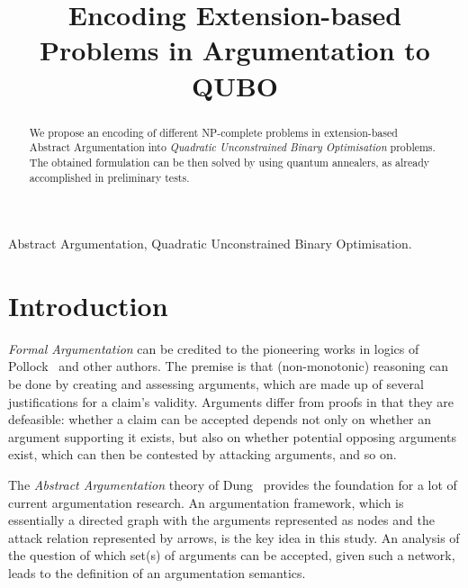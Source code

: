\documentclass[conference,compsocconf]{IEEEtran}
\begin{document}
\title{Encoding Extension-based Problems in Argumentation to QUBO}

\author{
\and
{}
}

\maketitle

\begin{abstract}
We propose an encoding of different NP-complete problems in extension-based Abstract Argumentation into \emph{Quadratic Unconstrained Binary Optimisation} problems. The obtained formulation can be then solved by using quantum annealers, as already accomplished in preliminary tests.
\end{abstract}

\begin{IEEEkeywords}
Abstract Argumentation, Quadratic Unconstrained Binary Optimisation.
\end{IEEEkeywords}

\section{Introduction}\label{sect:intro}
\emph{Formal Argumentation} can be credited to the pioneering works in logics of Pollock~\cite{pollock92} and other authors. The premise is that (non-monotonic) reasoning can be done by creating and assessing arguments, which are made up of several justifications for a claim's validity. Arguments differ from proofs in that they are defeasible: whether a claim can be accepted depends not only on whether an argument supporting it exists, but also on whether potential opposing arguments exist, which can then be contested by attacking arguments, and so on.

The \emph{Abstract Argumentation} theory of Dung~\cite{Dung:1995} provides the foundation for a lot of current argumentation research. An argumentation framework, which is essentially a directed graph with the arguments represented as nodes and the attack relation represented by arrows, is the key idea in this study. An analysis of the question of which set(s) of arguments can be accepted, given such a network, leads to the definition of an argumentation semantics. 
\end{document}

